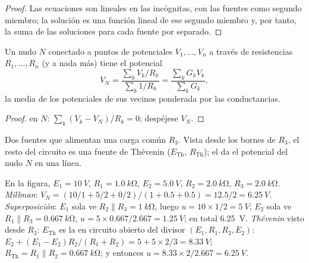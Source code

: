 \begin{proof}
Las ecuaciones son lineales en las incógnitas, con las fuentes como
segundo miembro; la solución es una función lineal de ese segundo miembro
y, por tanto, la suma de las soluciones para cada fuente por separado.
\end{proof}

\begin{proposition}\label{prop:b1:dc-circuits:millman}
Un nudo $N$ conectado a puntos de potenciales $V_1, \dots, V_n$ a través
de resistencias $R_1, \dots, R_n$ (y a nada más) tiene el potencial
\[
V_N = \frac{\sum_k V_k/R_k}{\sum_k 1/R_k} = \frac{\sum_k G_k V_k}{\sum_k G_k},
\]
la media de los potenciales de sus vecinos ponderada por las conductancias.
\end{proposition}

\begin{proof}
 en $N$: $\sum_k (V_k - V_N)/R_k = 0$; despéjese $V_N$.
\end{proof}

\begin{omfigure}

{\small Dos fuentes que alimentan una carga común $R_3$. Vista desde los
bornes de $R_3$, el resto del circuito es una fuente de Thévenin
($E_{\mathrm{Th}}$, $R_{\mathrm{Th}}$); el  da el
potencial del nudo $N$ en una línea.}
\end{omfigure}

\begin{example}\label{ex:b1:dc-circuits:threeways}
En la figura, $E_1 = \qty{10}{V}$, $R_1 = \qty{1.0}{k\ohm}$, $E_2 =
\qty{5.0}{V}$, $R_2 = \qty{2.0}{k\ohm}$, $R_3 = \qty{2.0}{k\ohm}$.
\emph{Millman}: $V_N = (10/1 + 5/2 + 0/2)/(1 + 0.5 + 0.5) = 12.5/2 =
\qty{6.25}{V}$. \emph{Superposición}: $E_1$ sola ve $R_2 \parallel
R_3 = \qty{1}{k\ohm}$, luego $u = 10 \times 1/2 = \qty{5}{V}$; $E_2$ sola
ve $R_1 \parallel R_3 = \qty{0.667}{k\ohm}$, $u = 5 \times 0.667/2.667
= \qty{1.25}{V}$; en total \qty{6.25}{V}. \emph{Thévenin} visto desde
$R_3$: $E_{\mathrm{Th}}$ es la  en circuito abierto del divisor
$(E_1, R_1, R_2, E_2)$: $E_2 + (E_1 - E_2)R_2/(R_1 + R_2) = 5 + 5 \times
2/3 = \qty{8.33}{V}$; $R_{\mathrm{Th}} = R_1 \parallel R_2 =
\qty{0.667}{k\ohm}$; y entonces $u = 8.33 \times 2/2.667 = \qty{6.25}{V}$.
\end{example}

